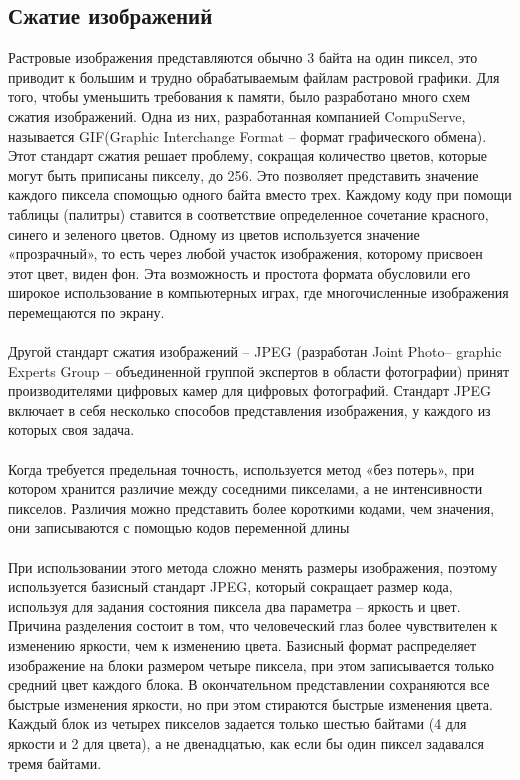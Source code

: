 \subsection{Сжатие изображений}
Растровые изображения представляются обычно 3 байта на один пиксел, это приводит к большим и трудно обрабатываемым файлам растровой графики. Для того, чтобы уменьшить требования к памяти, было разработано много схем сжатия изображений. Одна из них, разработанная компанией CompuServe, называется GIF(Graphic Interchange Format -- формат графического обмена). Этот стандарт сжатия решает проблему, сокращая количество цветов, которые могут быть приписаны пикселу, до 256. Это позволяет представить значение каждого пиксела спомощью одного байта вместо трех. Каждому коду при помощи таблицы (палитры) ставится в соответствие определенное сочетание красного, синего и зеленого цветов. Одному из цветов используется значение «прозрачный», то есть через любой участок изображения, которому присвоен этот цвет, виден фон. Эта возможность и простота формата обусловили его широкое использование в компьютерных играх, где многочисленные изображения перемещаются по экрану.\\
\\Другой стандарт сжатия изображений -- JPEG (разработан Joint Photo-- graphic Experts Group -- объединенной группой экспертов в области фотографии) принят производителями цифровых камер для цифровых фотографий. Стандарт JPEG включает в себя несколько способов представления изображения, у каждого из которых своя задача.\\
\\Когда требуется предельная точность, используется метод «без потерь», при котором хранится различие между соседними пикселами, а не интенсивности пикселов.  Различия можно представить более короткими кодами, чем значения, они записываются с помощью кодов переменной длины\\
\\При использовании этого метода сложно менять размеры изображения, поэтому используется базисный стандарт JPEG, который сокращает размер кода, используя для задания состояния пиксела два параметра – яркость и цвет. Причина разделения состоит в том, что человеческий глаз более чувствителен к изменению яркости, чем к изменению цвета. Базисный формат распределяет изображение на блоки размером четыре пиксела, при этом записывается только средний цвет каждого блока. В окончательном представлении сохраняются все быстрые изменения яркости, но при этом стираются быстрые изменения цвета. Каждый блок из четырех пикселов задается только шестью байтами (4 для яркости и 2 для цвета), а не двенадцатью, как если бы один пиксел задавался тремя байтами.\\

